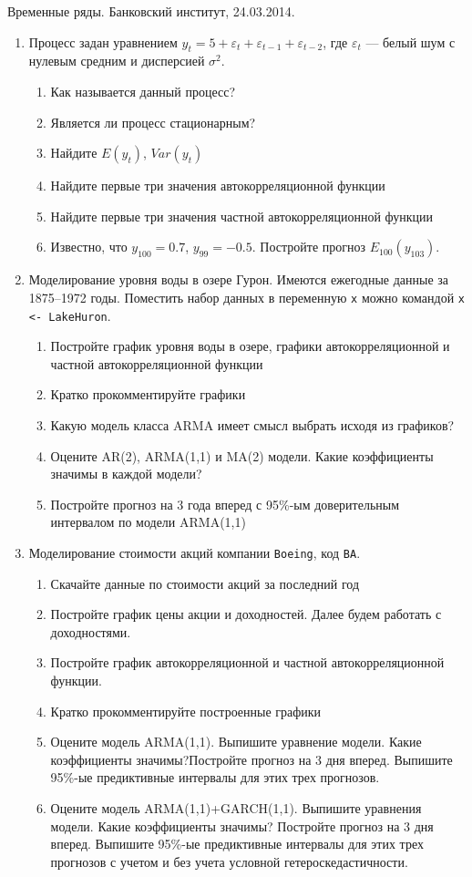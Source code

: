 \documentclass[12pt,a4paper]{article}
\begin{document}
Временные ряды. Банковский институт, 24.03.2014.

\begin{enumerate}

\item Процесс задан уравнением $y_t=5+\varepsilon_t+\varepsilon_{t-1}+\varepsilon_{t-2}$, где $\varepsilon_t$ --- белый шум с нулевым средним и дисперсией $\sigma^2$.
\begin{enumerate}
\item Как называется данный процесс?
\item Является ли процесс стационарным?
\item Найдите $E(y_t)$, $Var(y_t)$
\item Найдите первые три значения автокорреляционной функции
\item Найдите первые три значения частной автокорреляционной функции
\item Известно, что $y_{100}=0.7$, $y_{99}=-0.5$. Постройте прогноз $E_{100}(y_{103})$.
\end{enumerate}


\item Моделирование уровня воды в озере Гурон. Имеются ежегодные данные за 1875–1972 годы. Поместить набор данных в переменную \verb|x| можно командой \verb|x <- LakeHuron|.

\begin{enumerate}
\item Постройте график уровня воды в озере, графики автокорреляционной и частной автокорреляционной функции
\item Кратко прокомментируйте графики
\item Какую модель класса ARMA имеет смысл выбрать исходя из графиков?
\item Оцените AR(2), ARMA(1,1) и MA(2) модели. Какие коэффициенты значимы в каждой модели?
\item Постройте прогноз на 3 года вперед с 95\%-ым доверительным интервалом по модели ARMA(1,1) 
\end{enumerate}


\item Моделирование стоимости акций компании \verb|Boeing|, код \verb|BA|.
\begin{enumerate}
\item Скачайте данные по стоимости акций за последний год
\item Постройте график цены акции и доходностей. Далее будем работать с доходностями.
\item Постройте график автокорреляционной и частной автокорреляционной функции. 
\item Кратко прокомментируйте построенные графики
\item Оцените модель ARMA(1,1). Выпишите уравнение модели. Какие коэффициенты значимы?Постройте прогноз на 3 дня вперед. Выпишите 95\%-ые предиктивные интервалы для этих трех прогнозов.
\item Оцените модель ARMA(1,1)+GARCH(1,1). Выпишите уравнения модели. Какие коэффициенты значимы?  Постройте прогноз на 3 дня вперед. Выпишите 95\%-ые предиктивные интервалы для этих трех прогнозов с учетом и без учета условной гетероскедастичности.

\end{enumerate}
 
\end{enumerate}
\end{document}
